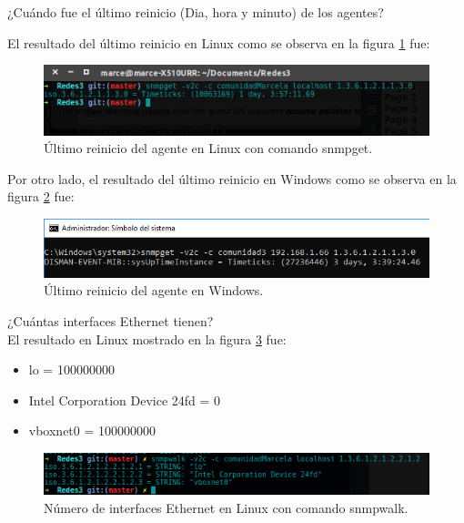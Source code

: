 \item ¿Cuándo fue el último reinicio (Dia, hora y minuto)  de los agentes?

El resultado del último reinicio en Linux como se observa en la figura \ref{image:reinicio} fue:

\FloatBarrier
\begin{figure}[htbp!]
		\centering
	\includegraphics[width=.9 \textwidth]{images/Pregunta1}
		\caption{Último reinicio del agente en Linux con comando snmpget.}
		\label{image:reinicio}
\end{figure}
\FloatBarrier

Por otro lado, el resultado del último reinicio en Windows como se observa en la figura \ref{image:reinicioW} fue:

\FloatBarrier
\begin{figure}[htbp!]
		\centering
			\includegraphics[width=.9 \textwidth]{images/windows1}
		\caption{Último reinicio del agente en Windows.}
		\label{image:reinicioW}
\end{figure}
\FloatBarrier

\item ¿Cuántas interfaces Ethernet tienen?
\\ El resultado en Linux mostrado en la figura \ref{image:interfaces} fue:
\begin{itemize}
\item lo = 100000000
\item Intel Corporation Device 24fd = 0 
\item vboxnet0 = 100000000
\end{itemize}

\FloatBarrier
\begin{figure}[htbp!]
		\centering
	\includegraphics[width=.9 \textwidth]{images/Pregunta2L}
		\caption{Número de interfaces Ethernet en Linux con comando snmpwalk.}		\label{image:interfaces}
\end{figure}
\FloatBarrier

